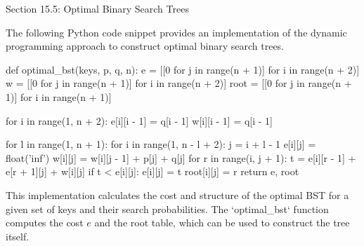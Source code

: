 \begin{notes}{Section 15.5: Optimal Binary Search Trees}
    \begin{highlight}
        The following Python code snippet provides an implementation of the dynamic programming approach to construct optimal binary search trees.
    \begin{code}[Python]
    def optimal_bst(keys, p, q, n):
        e = [[0 for j in range(n + 1)] for i in range(n + 2)]
        w = [[0 for j in range(n + 1)] for i in range(n + 2)]
        root = [[0 for j in range(n + 1)] for i in range(n + 1)]
    
        for i in range(1, n + 2):
            e[i][i - 1] = q[i - 1]
            w[i][i - 1] = q[i - 1]
    
        for l in range(1, n + 1):
            for i in range(1, n - l + 2):
                j = i + l - 1
                e[i][j] = float('inf')
                w[i][j] = w[i][j - 1] + p[j] + q[j]
                for r in range(i, j + 1):
                    t = e[i][r - 1] + e[r + 1][j] + w[i][j]
                    if t < e[i][j]:
                        e[i][j] = t
                        root[i][j] = r
        return e, root
    \end{code}
        This implementation calculates the cost and structure of the optimal BST for a given set of keys and their search probabilities. The `optimal\_bst` function computes the cost $e$ and the root 
        table, which can be used to construct the tree itself.
    \end{highlight}    
\end{notes}